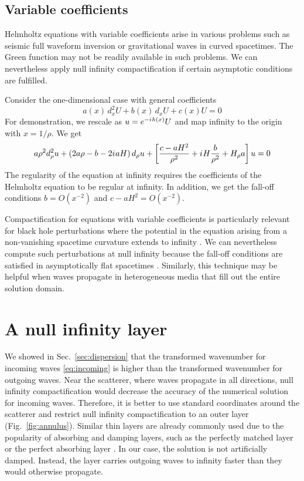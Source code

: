 \documentclass[draft,onefignum,onetabnum]{siamart190516}
\newcommand{\iu}{{i\mkern1mu}}
\begin{document}
\subsection{Variable coefficients}

Helmholtz equations with variable coefficients arise in various problems such as seismic full waveform inversion or gravitational waves in curved spacetimes. The Green function may not be readily available in such problems. We can nevertheless apply null infinity compactification if certain asymptotic conditions are fulfilled.  

Consider the one-dimensional case with general coefficients
\[ a(x) \, d_x^2 U + b(x) \, d_x U + c(x) U = 0 \]
For demonstration, we rescale as $u=e^{-\iu h(x)} U$ and map infinity to the origin with $x=1/\rho$. We get 
\[ a \rho^2 d_\rho^2 u + \left( 2 a \rho - b - 2 \iu a H \right) d_\rho u + \left[ \frac{c-a H^2}{\rho^2} + \iu H \frac{b}{\rho^2} + H_\rho a \right] u = 0 \]
The regularity of the equation at infinity requires the coefficients of the Helmholtz equation to be regular at infinity. In addition, we get the fall-off conditions $b=O(x^{-2})$ and $c-a H^2=O(x^{-2})$.

Compactification for equations with variable coefficients is particularly relevant for black hole perturbations where the potential in the equation arising from a non-vanishing spacetime curvature extends to infinity \cite{regge1957stability}. We can nevertheless compute such perturbations at null infinity because the fall-off conditions are satisfied in asymptotically flat spacetimes \cite{ZengFramework, jaramillo2021pseudospectrum}. Similarly, this technique may be helpful when waves propagate in heterogeneous media that fill out the entire solution domain.

\section{A null infinity layer}\label{sec:nil}
We showed in Sec.~\ref{sec:dispersion} that the transformed wavenumber for incoming waves \eqref{eq:incoming} is higher than the transformed wavenumber for outgoing waves. Near the scatterer, where waves propagate in all directions, null infinity compactification would decrease the accuracy of the numerical solution for incoming waves. Therefore, it is better to use standard coordinates around the scatterer and restrict null infinity compactification to an outer layer (Fig.~\ref{fig:annulus}). Similar thin layers are already commonly used due to the popularity of absorbing and damping layers, such as the perfectly matched layer \cite{BERENGER1994185} or the perfect absorbing layer \cite{wang2017perfect, yang2021truly}. In our case, the solution is not artificially damped. Instead, the layer carries outgoing waves to infinity faster than they would otherwise propagate. 
\end{document}
